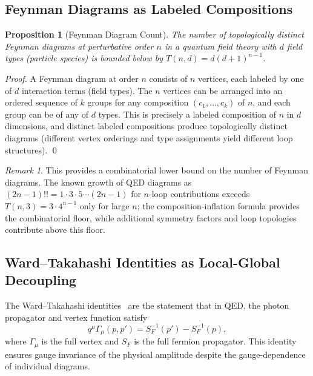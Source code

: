 \documentclass[twocolumn,10pt,a4paper]{article}
\theoremstyle{thmstyle}
\newtheorem{proposition}[theorem]{Proposition}
\theoremstyle{definition}
\theoremstyle{remark}
\newtheorem{remark}[theorem]{Remark}
\begin{document}
\subsection{Feynman Diagrams as Labeled Compositions}

\begin{proposition}[Feynman Diagram Count]
\label{prop:feynman-count}
The number of topologically distinct Feynman diagrams at perturbative
order $n$ in a quantum field theory with $d$ field types (particle
species) is bounded below by $T(n,d) = d(d+1)^{n-1}$.
\end{proposition}

\begin{proof}
A Feynman diagram at order $n$ consists of $n$ vertices, each labeled
by one of $d$ interaction terms (field types). The $n$ vertices can be
arranged into an ordered sequence of $k$ groups for any composition
$(c_1, \ldots, c_k)$ of $n$, and each group can be of any of $d$
types. This is precisely a labeled composition of $n$ in $d$
dimensions, and distinct labeled compositions produce topologically
distinct diagrams (different vertex orderings and type assignments
yield different loop structures). \qed
\end{proof}

\begin{remark}
This provides a combinatorial lower bound on the number of Feynman
diagrams. The known growth of QED diagrams as $(2n-1)!! = 1 \cdot 3
\cdot 5 \cdots (2n-1)$ for $n$-loop contributions exceeds
$T(n,3) = 3 \cdot 4^{n-1}$ only for large $n$; the composition-inflation
formula provides the combinatorial floor, while additional symmetry
factors and loop topologies contribute above this floor.
\end{remark}

\subsection{Ward--Takahashi Identities as Local-Global Decoupling}

The Ward--Takahashi identities~\citep{ward1950identity,takahashi1957wardidentity}
are the statement that in QED, the photon propagator and vertex function
satisfy
\begin{equation}
q^\mu \Gamma_\mu(p, p') = S_F^{-1}(p') - S_F^{-1}(p),
\end{equation}
where $\Gamma_\mu$ is the full vertex and $S_F$ is the full fermion
propagator. This identity ensures gauge invariance of the physical
amplitude despite the gauge-dependence of individual diagrams.
\end{document}
